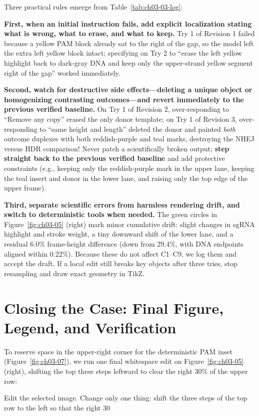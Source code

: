 Three practical rules emerge from Table~\ref{tab:ch03-03-log}:

\textbf{First, when an initial instruction fails, add explicit localization stating what is wrong, what to erase, and what to keep.} Try 1 of Revision 1 failed because a yellow PAM block already sat to the right of the gap, so the model left the extra left yellow block intact; specifying on Try 2 to ``erase the left yellow highlight back to dark-gray DNA and keep only the upper-strand yellow segment right of the gap'' worked immediately.

\textbf{Second, watch for destructive side effects—deleting a unique object or homogenizing contrasting outcomes—and revert immediately to the previous verified baseline.} On Try 1 of Revision 2, over-responding to ``Remove any copy'' erased the only donor template; on Try 1 of Revision 3, over-responding to ``same height and length'' deleted the donor and painted \emph{both} outcome duplexes with both reddish-purple and teal marks, destroying the NHEJ versus HDR comparison! Never patch a scientifically broken output; \textbf{step straight back to the previous verified baseline} and add protective constraints (e.g., keeping only the reddish-purple mark in the upper lane, keeping the teal insert and donor in the lower lane, and raising only the top edge of the upper frame).

\textbf{Third, separate scientific errors from harmless rendering drift, and switch to deterministic tools when needed.} The green circles in Figure~\ref{fig:ch03-05} (right) mark minor cumulative drift: slight changes in sgRNA highlight and stroke weight, a tiny downward shift of the lower lane, and a residual 6.0\% frame-height difference (down from 29.4\%, with DNA endpoints aligned within 0.22\%). Because these do not affect C1--C9, we log them and accept the draft. If a local edit still breaks key objects after three tries, stop resampling and draw exact geometry in TikZ.

\section{Closing the Case: Final Figure, Legend, and Verification}

To reserve space in the upper-right corner for the deterministic PAM inset (Figure~\ref{fig:ch03-07}), we run one final whitespace edit on Figure~\ref{fig:ch03-05} (right), shifting the top three steps leftward to clear the right 30\% of the upper row:

\begin{Prompt}
Edit the selected image. Change only one thing: shift the three steps of the top row to the left so that the right 30%
\end{Prompt}

